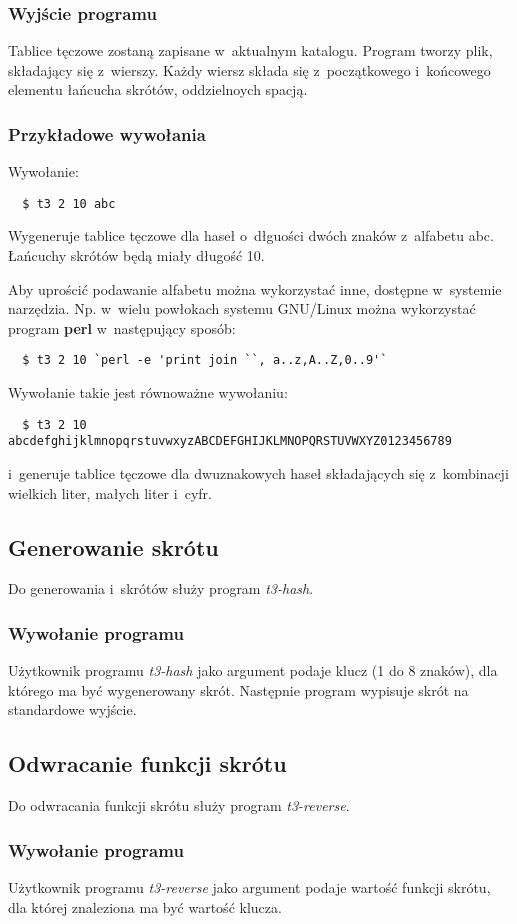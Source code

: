 \documentclass{scrartcl}
\begin{document}
\subsubsection{Wyjście programu}
Tablice tęczowe zostaną zapisane w~aktualnym katalogu.
Program tworzy plik, składający się z~wierszy. Każdy wiersz składa się z~początkowego i~końcowego elementu łańcucha skrótów, oddzielnoych spacją.

\subsubsection{Przykładowe wywołania}
Wywołanie:
\begin{lstlisting}
  $ t3 2 10 abc
\end{lstlisting}
Wygeneruje tablice tęczowe dla haseł o~dłguości dwóch znaków z~alfabetu abc. Łańcuchy skrótów będą miały długość 10.

Aby uprościć podawanie alfabetu można wykorzystać inne, dostępne w~systemie narzędzia. Np. w~wielu powłokach systemu GNU/Linux można wykorzystać program \textbf{perl} w~następujący sposób:
\begin{lstlisting}
  $ t3 2 10 `perl -e 'print join ``, a..z,A..Z,0..9'`
\end{lstlisting}
Wywołanie takie jest równoważne wywołaniu:
\begin{lstlisting}
  $ t3 2 10 abcdefghijklmnopqrstuvwxyzABCDEFGHIJKLMNOPQRSTUVWXYZ0123456789
\end{lstlisting}
i~generuje tablice tęczowe dla dwuznakowych haseł składających się z~kombinacji wielkich liter, małych liter i~cyfr.
\subsection{Generowanie skrótu}
Do generowania i~skrótów służy program \emph{t3-hash}.
\subsubsection{Wywołanie programu}
Użytkownik programu \emph{t3-hash} jako argument podaje klucz (1 do 8 znaków), dla którego ma być wygenerowany skrót.
Następnie program wypisuje skrót na standardowe wyjście.


\subsection{Odwracanie funkcji skrótu}
Do odwracania funkcji skrótu służy program \emph{t3-reverse}.
\subsubsection{Wywołanie programu}
Użytkownik programu \emph{t3-reverse} jako argument podaje wartość funkcji skrótu, dla której znaleziona ma być wartość klucza.
\end{document}
